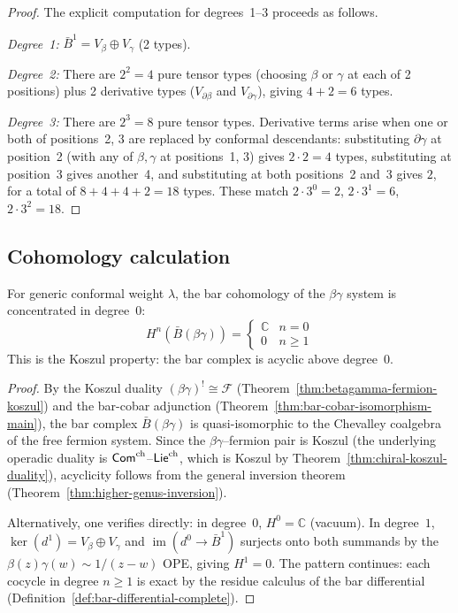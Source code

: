 \begin{proof}
The explicit computation for degrees~1--3 proceeds as follows.

\emph{Degree~1:}  $\bar{B}^1 = V_\beta \oplus V_\gamma$ (2 types).

\emph{Degree~2:}  There are $2^2 = 4$ pure tensor types (choosing $\beta$ or $\gamma$ at each of 2 positions) plus 2 derivative types ($V_{\partial\beta}$ and $V_{\partial\gamma}$), giving $4 + 2 = 6$ types.

\emph{Degree~3:}  There are $2^3 = 8$ pure tensor types.  Derivative terms arise when one or both of positions~2, 3 are replaced by conformal descendants: substituting $\partial\gamma$ at position~2 (with any of $\beta, \gamma$ at positions~1, 3) gives $2 \cdot 2 = 4$ types, substituting at position~3 gives another~4, and substituting at both positions~2 and~3 gives $2$, for a total of $8 + 4 + 4 + 2 = 18$ types.  These match $2 \cdot 3^0 = 2$, $2 \cdot 3^1 = 6$, $2 \cdot 3^2 = 18$.
\end{proof}

\subsection{Cohomology calculation}

\begin{theorem}
\label{thm:betagamma-bar-cohomology}
For generic conformal weight $\lambda$, the bar cohomology of the
$\beta\gamma$ system is concentrated in degree~$0$:
\[H^n(\bar{B}(\beta\gamma)) = \begin{cases}
\mathbb{C} & n = 0 \\
0 & n \geq 1
\end{cases}\]
This is the Koszul property: the bar complex is acyclic above degree~$0$.
\end{theorem}

\begin{proof}
By the Koszul duality $(\beta\gamma)^! \cong \mathcal{F}$
(Theorem~\ref{thm:betagamma-fermion-koszul}) and the bar-cobar
adjunction (Theorem~\ref{thm:bar-cobar-isomorphism-main}), the bar
complex $\bar{B}(\beta\gamma)$ is quasi-isomorphic to the Chevalley
coalgebra of the free fermion system.  Since the $\beta\gamma$--fermion
pair is Koszul (the underlying operadic duality is $\mathsf{Com}^{\mathrm{ch}}$--$\mathsf{Lie}^{\mathrm{ch}}$,
which is Koszul by Theorem~\ref{thm:chiral-koszul-duality}), acyclicity
follows from the general inversion theorem
(Theorem~\ref{thm:higher-genus-inversion}).

Alternatively, one verifies directly: in degree~$0$, $H^0 = \mathbb{C}$
(vacuum).  In degree~$1$, $\ker(d^1) = V_\beta \oplus V_\gamma$ and
$\operatorname{im}(d^0 \to \bar{B}^1)$ surjects onto both summands by
the $\beta(z)\gamma(w) \sim 1/(z-w)$ OPE, giving $H^1 = 0$.
The pattern continues: each cocycle in degree $n \geq 1$ is exact by the
residue calculus of the bar differential (Definition~\ref{def:bar-differential-complete}).
\end{proof}

